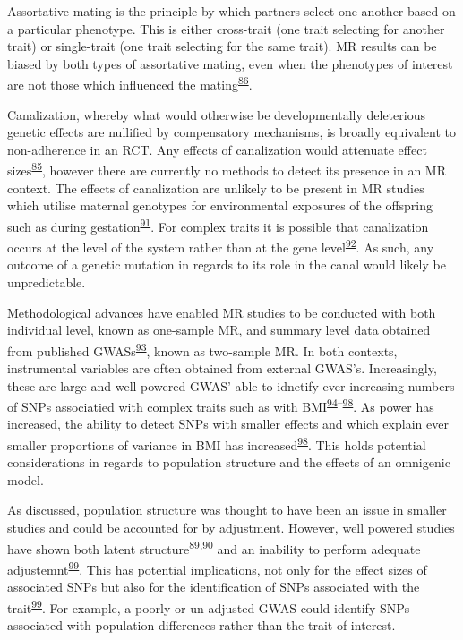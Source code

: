 \documentclass[11pt,twoside]{bristolthesis}
\begin{document}
Assortative mating is the principle by which partners select one another based on a particular phenotype. This is either cross-trait (one trait selecting for another trait) or single-trait (one trait selecting for the same trait). MR results can be biased by both types of assortative mating, even when the phenotypes of interest are not those which influenced the mating\textsuperscript{\protect\hyperlink{ref-Hartwig2018}{86}}.

Canalization, whereby what would otherwise be developmentally deleterious genetic effects are nullified by compensatory mechanisms, is broadly equivalent to non-adherence in an RCT. Any effects of canalization would attenuate effect sizes\textsuperscript{\protect\hyperlink{ref-Smith2004}{85}}, however there are currently no methods to detect its presence in an MR context. The effects of canalization are unlikely to be present in MR studies which utilise maternal genotypes for environmental exposures of the offspring such as during gestation\textsuperscript{\protect\hyperlink{ref-Smith2010}{91}}. For complex traits it is possible that canalization occurs at the level of the system rather than at the gene level\textsuperscript{\protect\hyperlink{ref-Geiler-Samerotte2019}{92}}. As such, any outcome of a genetic mutation in regards to its role in the canal would likely be unpredictable.

Methodological advances have enabled MR studies to be conducted with both individual level, known as one-sample MR, and summary level data obtained from published GWASs\textsuperscript{\protect\hyperlink{ref-Pierce2013}{93}}, known as two-sample MR. In both contexts, instrumental variables are often obtained from external GWAS's. Increasingly, these are large and well powered GWAS' able to idnetify ever increasing numbers of SNPs associatied with complex traits such as with BMI\textsuperscript{\protect\hyperlink{ref-Speliotes2010a}{94}--\protect\hyperlink{ref-Yengo2018}{98}}. As power has increased, the ability to detect SNPs with smaller effects and which explain ever smaller proportions of variance in BMI has increased\textsuperscript{\protect\hyperlink{ref-Yengo2018}{98}}. This holds potential considerations in regards to population structure and the effects of an omnigenic model.

As discussed, population structure was thought to have been an issue in smaller studies and could be accounted for by adjustment. However, well powered studies have shown both latent structure\textsuperscript{\protect\hyperlink{ref-Haworth2019}{89},\protect\hyperlink{ref-Berg2019}{90}} and an inability to perform adequate adjustemnt\textsuperscript{\protect\hyperlink{ref-Sohail2019}{99}}. This has potential implications, not only for the effect sizes of associated SNPs but also for the identification of SNPs associated with the trait\textsuperscript{\protect\hyperlink{ref-Sohail2019}{99}}. For example, a poorly or un-adjusted GWAS could identify SNPs associated with population differences rather than the trait of interest.
\end{document}
